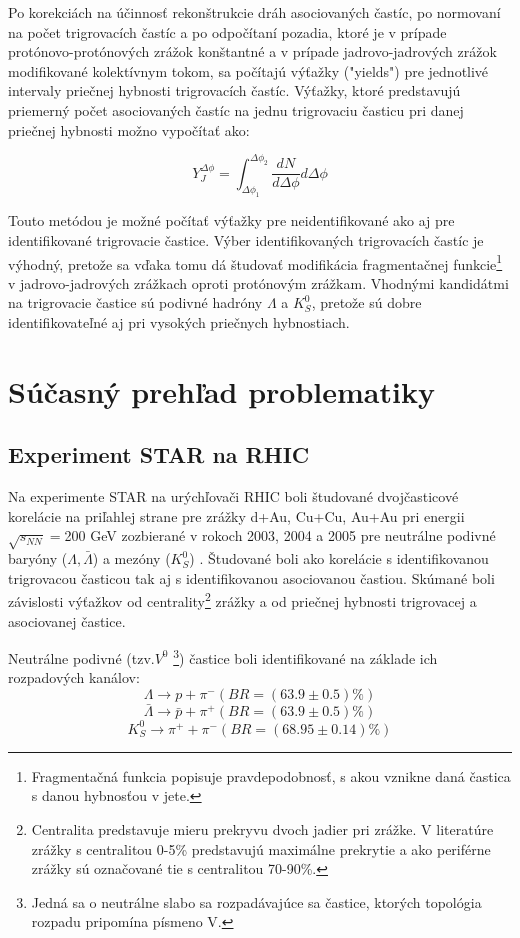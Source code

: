 \documentclass[thesismargins, thesislinespacing]{rnthesis}
\begin{document}
Po korekciách na účinnosť rekonštrukcie dráh asociovaných častíc, po normovaní na počet trigrovacích častíc a po odpočítaní pozadia, ktoré je v prípade protónovo-protónových zrážok konštantné a v prípade jadrovo-jadrových zrážok modifikované kolektívnym tokom, sa počítajú výťažky ("yields") pre jednotlivé intervaly priečnej hybnosti trigrovacích častíc. Výťažky, ktoré predstavujú priemerný počet asociovaných častíc na jednu trigrovaciu časticu pri danej priečnej hybnosti možno vypočítať ako:

\begin{equation}
Y_J^{\Delta\phi}=\int_{\Delta \phi_1}^{\Delta \phi_2} \frac{dN}{d\Delta \phi } d\Delta\phi 
\label{yield}
\end{equation} 

Touto metódou je možné počítať výťažky pre neidentifikované ako aj pre identifikované trigrovacie častice. Výber identifikovaných trigrovacích častíc je výhodný, pretože sa vďaka tomu dá študovať modifikácia fragmentačnej funkcie\footnote{Fragmentačná funkcia popisuje pravdepodobnosť, s akou vznikne daná častica s danou hybnosťou v jete.} v jadrovo-jadrových zrážkach oproti protónovým zrážkam. Vhodnými kandidátmi na trigrovacie častice sú podivné hadróny $\Lambda$ a $K^0_S$, pretože sú dobre identifikovateľné aj pri vysokých priečnych hybnostiach. 

\section{Súčasný prehľad problematiky}
\subsection{Experiment STAR na RHIC}
Na experimente STAR na urýchľovači RHIC boli študované dvojčasticové korelácie na priľahlej strane pre zrážky d+Au, Cu+Cu, Au+Au pri energii $\sqrt{s_{NN}}=$200 GeV zozbierané v rokoch 2003, 2004 a 2005 pre neutrálne podivné baryóny ($\Lambda , \bar{\Lambda}$) a mezóny ($K^0_S$) \cite{clanokstar}. Študované boli ako korelácie s identifikovanou trigrovacou časticou tak aj s identifikovanou asociovanou častiou. Skúmané boli závislosti výťažkov od centrality\footnote{Centralita predstavuje mieru prekryvu dvoch jadier pri zrážke. V literatúre zrážky s centralitou 0-5\% predstavujú maximálne prekrytie a ako periférne zrážky sú označované tie s centralitou 70-90\%.} zrážky a od priečnej hybnosti trigrovacej a asociovanej častice.

Neutrálne podivné (tzv.$V^0$ \footnote{Jedná sa o neutrálne slabo sa rozpadávajúce sa častice, ktorých topológia rozpadu pripomína písmeno V.}) častice boli identifikované na základe ich rozpadových kanálov:
\begin{equation}
\Lambda \rightarrow p + \pi^{-}  (BR=(63.9 \pm 0.5)\%)
\end{equation}
\begin{equation}
\bar{\Lambda} \rightarrow \bar{p} + \pi^{+}  (BR=(63.9 \pm 0.5)\%)
\end{equation}
\begin{equation}
K^0_S \rightarrow \pi^{+} + \pi^{-}  (BR=(68.95 \pm 0.14)\%)
\end{equation}
\end{document}
